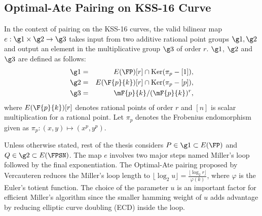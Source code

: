 \subsection{Optimal-Ate Pairing on KSS-16 Curve}
In the context of pairing on the KSS-16 curves, the valid bilinear map $e:\g1 \times \g2 \rightarrow \g3$ takes input from two additive rational point groups $\g1, \g2$ 
and output an element in the multiplicative group $\g3$ of order $r$. 
$\g1$, $\g2$ and $\g3$ are defined as follows:
\begin{eqnarray}\label{eq:g1}
\g1 & = &  E(\FP) [r] \cap \text{Ker}(\pi_p - [1]), \nonumber \\
\g2 & = &  E(\F{p}{k}) [r] \cap \text{Ker}(\pi_p - [p]), \nonumber \\
\g3 & = & \mF{p}{k}/(\mF{p}{k})^r, \nonumber
\end{eqnarray}
where $E(\F{p}{k})[r]$ denotes rational points of order $r$ and $[n]$ is scalar multiplication for a rational point. 
Let $\pi_p$ denotes the Frobenius endomorphism given as $\pi_p: (x,y) \mapsto (x^p,y^p)$.

Unless otherwise stated, rest of the thesis considers $P \in \g1 \subset E(\FP)$ and  $Q \in \g2 \subset  E(\FPSN)$. The map $e$ involves two major steps named Miller's loop followed by the final exponentiation.
The Optimal-Ate pairing \cite{DBLP:journals/tit/Vercauteren10} proposed by Vercauteren reduces the Miller's loop length  to $\lfloor \log_2 u \rfloor = \frac{\lfloor \log_2 r \rfloor }{\varphi(k)} $, where $\varphi$ is the Euler's totient function.
The choice of the parameter $u$ is an important factor for efficient Miller's algorithm since the smaller hamming weight of $u$ adds advantage by reducing elliptic curve doubling (ECD) inside the loop.

